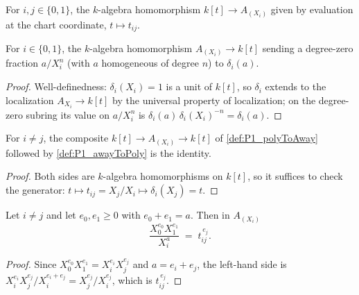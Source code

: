 \begin{definition}
  \label{def:P1_polyToAway}
  \leanok
  For \(i, j \in \{0,1\}\), the \(k\)-algebra homomorphism \(k[t] \to A_{(X_i)}\) given by
  evaluation at the chart coordinate, \(t \mapsto t_{ij}\).
\end{definition}

\begin{definition}
  \label{def:P1_awayToPoly}
  \leanok
  For \(i \in \{0,1\}\), the \(k\)-algebra homomorphism \(A_{(X_i)} \to k[t]\) sending a
  degree-zero fraction \(a / X_i^n\) (with \(a\) homogeneous of degree \(n\)) to
  \(\delta_i(a)\).
\end{definition}
\begin{proof}
  \leanok
  Well-definedness: \(\delta_i(X_i) = 1\) is a unit of \(k[t]\), so \(\delta_i\) extends to
  the localization \(A_{X_i} \to k[t]\) by the universal property of localization; on the
  degree-zero subring its value on \(a / X_i^n\) is
  \(\delta_i(a)\,\delta_i(X_i)^{-n} = \delta_i(a)\).
\end{proof}

\begin{lemma}
  \label{lem:P1_awayToPoly_polyToAway}
  \leanok
  For \(i \neq j\), the composite \(k[t] \to A_{(X_i)} \to k[t]\) of
  \ref{def:P1_polyToAway} followed by \ref{def:P1_awayToPoly} is the identity.
\end{lemma}
\begin{proof}
  \leanok
  Both sides are \(k\)-algebra homomorphisms on \(k[t]\), so it suffices to check the
  generator: \(t \mapsto t_{ij} = X_j / X_i \mapsto \delta_i(X_j) = t\).
\end{proof}

\begin{lemma}
  \label{lem:P1_away_monomial}
  \leanok
  Let \(i \neq j\) and let \(e_0, e_1 \ge 0\) with \(e_0 + e_1 = a\). Then in \(A_{(X_i)}\)
  \[
    \frac{X_0^{e_0} X_1^{e_1}}{X_i^{a}} \;=\; t_{ij}^{\,e_j}.
  \]
\end{lemma}
\begin{proof}
  \leanok
  Since \(X_0^{e_0} X_1^{e_1} = X_i^{e_i} X_j^{e_j}\) and \(a = e_i + e_j\), the left-hand
  side is \(X_i^{e_i} X_j^{e_j} / X_i^{e_i + e_j} = X_j^{e_j} / X_i^{e_j}\), which is
  \(t_{ij}^{\,e_j}\).
\end{proof}

